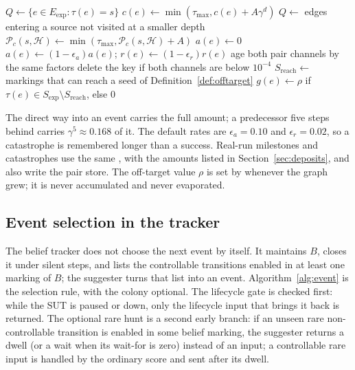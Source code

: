 \documentclass[11pt,a4paper]{article}
\newcommand{\TS}{\mathcal{H}}
\newcommand{\Pair}{\mathcal{P}}
\newcommand{\Tau}{\tau_{\max}}
\begin{document}
\begin{algorithm}[H]
\footnotesize
\caption{Pheromone deposition, back-propagation and evaporation}
\label{alg:pheromone}
\begin{algorithmic}[1]
  \State $Q\gets\{e\in E_{\mathrm{exp}}:\tau(e)=s\}$
      \State $c(e)\gets\min(\Tau,c(e)+A\gamma^{d})$
    \EndFor
    \State $Q\gets$ edges entering a source not visited at a
           smaller depth
  \EndFor
\EndProcedure
\Statex
\Procedure{PairDeposit}{$c,s,\TS,A$}
  \State $\Pair_c(s,\TS)\gets\min(\Tau,\Pair_c(s,\TS)+A)$
\EndProcedure
\Statex
{}
      \State $a(e)\gets0$
    \EndIf
      \State $a(e)\gets(1-\epsilon_a)a(e)$;
             $r(e)\gets(1-\epsilon_r)r(e)$
    \EndIf
  \EndFor
  \ForAll{$(s,\TS)$ in the pair store}
      \State age both pair channels by the same factors
    \EndIf
    \State delete the key if both channels are below $10^{-4}$
  \EndFor
\EndProcedure
\Statex
{}
  \State $S_{\mathrm{reach}}\gets$ markings that can reach a seed of
         Definition~\ref{def:offtarget}
  \State $g(e)\gets\rho$ if
         $\tau(e)\in S_{\mathrm{exp}}\setminus S_{\mathrm{reach}}$, else $0$
\EndProcedure
\end{algorithmic}
\end{algorithm}

The direct way into an event carries the full amount; a predecessor five
steps behind carries $\gamma^5\approx0.168$ of it.  The default rates are
$\epsilon_a=0.10$ and $\epsilon_r=0.02$, so a catastrophe is remembered longer
than a success.  Real-run milestones and catastrophes use the same
, with the amounts listed in Section~\ref{sec:deposits}, and
also write the pair store.  The off-target value
$\rho$ is set by  whenever the graph grew; it is never
accumulated and never evaporated.

\subsection{Event selection in the tracker}\label{sec:alg-event}

The belief tracker does not choose the next event by itself.  It maintains
$B$, closes it under silent steps, and lists the controllable transitions
enabled in at least one marking of $B$; the suggester turns that list into an
event.  Algorithm~\ref{alg:event} is the selection rule, with the colony
optional.  The lifecycle gate is checked first: while the SUT is paused or
down, only the lifecycle input that brings it back is returned.  The optional
rare hunt is a second early branch: if an unseen rare non-controllable
transition is enabled in some belief marking, the suggester returns a dwell
(or a wait when its wait-for is zero) instead of an input; a controllable
rare input is handled by the ordinary score and sent after its dwell.
\end{document}
